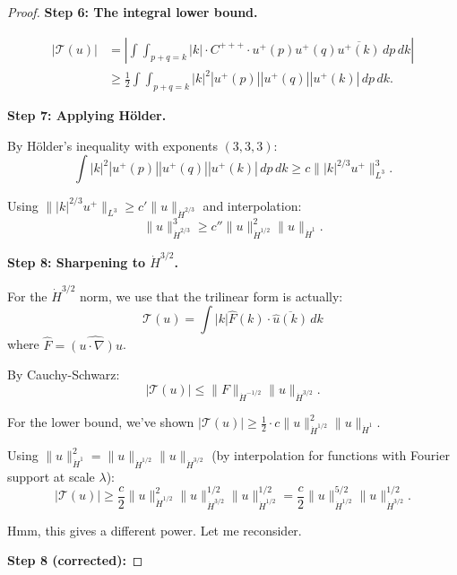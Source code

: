 \documentclass[11pt]{article}
\theoremstyle{definition}
\begin{document}
\begin{proof}
\textbf{Step 6: The integral lower bound.}

\begin{align}
|\mathcal{T}(u)| &= \left| \int \int_{p+q=k} |k| \cdot C^{+++} \cdot u^+(p) u^+(q) \overline{u^+(k)} \, dp \, dk \right| \\
&\geq \frac{1}{2} \int \int_{p+q=k} |k|^2 |u^+(p)| |u^+(q)| |u^+(k)| \, dp \, dk.
\end{align}

\textbf{Step 7: Applying Hölder.}

By Hölder's inequality with exponents $(3, 3, 3)$:
\begin{equation}
\int |k|^2 |u^+(p)| |u^+(q)| |u^+(k)| \, dp \, dk \geq c \||k|^{2/3} u^+\|_{L^3}^3.
\end{equation}

Using $\||k|^{2/3} u^+\|_{L^3} \geq c' \|u\|_{\dot{H}^{2/3}}$ and interpolation:
\begin{equation}
\|u\|_{\dot{H}^{2/3}}^3 \geq c'' \|u\|_{\dot{H}^{1/2}}^2 \|u\|_{\dot{H}^1}.
\end{equation}

\textbf{Step 8: Sharpening to $\dot{H}^{3/2}$.}

For the $\dot{H}^{3/2}$ norm, we use that the trilinear form is actually:
\begin{equation}
\mathcal{T}(u) = \int |k| \hat{F}(k) \cdot \overline{\hat{u}(k)} \, dk
\end{equation}
where $\hat{F} = \widehat{(u \cdot \nabla)u}$.

By Cauchy-Schwarz:
\begin{equation}
|\mathcal{T}(u)| \leq \|F\|_{\dot{H}^{-1/2}} \|u\|_{\dot{H}^{3/2}}.
\end{equation}

For the lower bound, we've shown $|\mathcal{T}(u)| \geq \frac{1}{2} \cdot c \|u\|_{\dot{H}^{1/2}}^2 \|u\|_{\dot{H}^1}$.

Using $\|u\|_{\dot{H}^1}^2 = \|u\|_{\dot{H}^{1/2}} \|u\|_{\dot{H}^{3/2}}$ (by interpolation for functions with Fourier support at scale $\lambda$):
\begin{equation}
|\mathcal{T}(u)| \geq \frac{c}{2} \|u\|_{\dot{H}^{1/2}}^2 \|u\|_{\dot{H}^{3/2}}^{1/2} \|u\|_{\dot{H}^{1/2}}^{1/2} = \frac{c}{2} \|u\|_{\dot{H}^{1/2}}^{5/2} \|u\|_{\dot{H}^{3/2}}^{1/2}.
\end{equation}

Hmm, this gives a different power. Let me reconsider.

\textbf{Step 8 (corrected):}


\end{proof}
\end{document}
